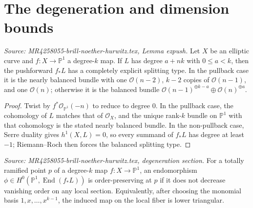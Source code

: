 \section{The degeneration and dimension bounds}

\begin{lemma}
  \label{lem:ezpush}
  \textit{Source: MR4258055-brill-noether-hurwitz.tex, Lemma ezpush.}
  Let \(X\) be an elliptic curve and \(f:X\to\mathbb P^1\) a degree-\(k\) map. If \(L\) has degree \(a+nk\) with \(0\le a<k\), then the pushforward \(f_*L\) has a completely explicit splitting type. In the pullback case it is the nearly balanced bundle with one \(\mathcal O(n-2)\), \(k-2\) copies of \(\mathcal O(n-1)\), and one \(\mathcal O(n)\); otherwise it is the balanced bundle \(\mathcal O(n-1)^{\oplus k-a}\oplus\mathcal O(n)^{\oplus a}\).
\end{lemma}

\begin{proof}
  Twist by \(f^*\mathcal O_{\mathbb P^1}(-n)\) to reduce to degree \(0\). In the pullback case, the cohomology of \(L\) matches that of \(\mathcal O_X\), and the unique rank-\(k\) bundle on \(\mathbb P^1\) with that cohomology is the stated nearly balanced bundle. In the non-pullback case, Serre duality gives \(h^1(X,L)=0\), so every summand of \(f_*L\) has degree at least \(-1\); Riemann--Roch then forces the balanced splitting type.
\end{proof}

\begin{definition}
  \label{def:order-preserving}
  \textit{Source: MR4258055-brill-noether-hurwitz.tex, degeneration section.}
  For a totally ramified point \(p\) of a degree-\(k\) map \(f:X\to\mathbb P^1\), an endomorphism \(\phi\in H^0(\mathbb P^1,\operatorname{End}(f_*L))\) is order-preserving at \(p\) if it does not decrease vanishing order on any local section. Equivalently, after choosing the monomial basis \(1,x,\dots,x^{k-1}\), the induced map on the local fiber is lower triangular.
\end{definition}

